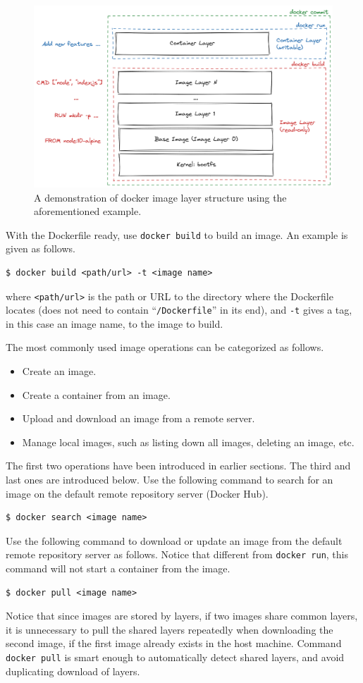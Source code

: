 \begin{figure}
	\centering
	\includegraphics[width=350pt]{chapters/ch-virtualization-and-containerization/figures/dockerlayerdemo.png}
	\caption{A demonstration of docker image layer structure using the aforementioned example.} \label{ch:vac:fig:dockerlayerdemo}
\end{figure}

With the Dockerfile ready, use \verb|docker build| to build an image. An example is given as follows.
\begin{lstlisting}
$ docker build <path/url> -t <image name>
\end{lstlisting}
where \verb|<path/url>| is the path or URL to the directory where the Dockerfile locates (does not need to contain ``\verb|/Dockerfile|'' in its end), and \verb|-t| gives a tag, in this case an image name, to the image to build.

The most commonly used image operations can be categorized as follows.
\begin{itemize}
  \item Create an image.
  \item Create a container from an image.
  \item Upload and download an image from a remote server.
  \item Manage local images, such as listing down all images, deleting an image, etc.
\end{itemize}

The first two operations have been introduced in earlier sections. The third and last ones are introduced below. Use the following command to search for an image on the default remote repository server (Docker Hub).
\begin{lstlisting}
$ docker search <image name>
\end{lstlisting}
Use the following command to download or update an image from the default remote repository server as follows. Notice that different from \verb|docker run|, this command will not start a container from the image.
\begin{lstlisting}
$ docker pull <image name>
\end{lstlisting}
Notice that since images are stored by layers, if two images share common layers, it is unnecessary to pull the shared layers repeatedly when downloading the second image, if the first image already exists in the host machine. Command \verb|docker pull| is smart enough to automatically detect shared layers, and avoid duplicating download of layers.

